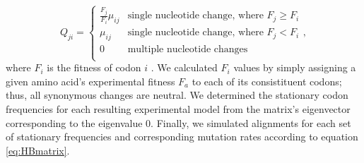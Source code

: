 \documentclass{pnastwo}
\begin{document}
\begin{article}
\begin{equation}
Q_{ji} = \left\{ 
\begin{array}{rl}
  \frac{F_j}{F_i}\mu_{ij} &\mbox{single nucleotide change, where $F_j \geq F_i$} \\
  \mu_{ij}           &\mbox{single nucleotide change, where $F_j < F_i$}  \\ 
  0                  &\mbox{multiple nucleotide changes} \\        
\end{array} \right.,
\end{equation}
where $F_i$ is the fitness of codon $i$ \cite{Bloom2014a,Bloom2014b}. We calculated $F_i$ values by simply assigning a given amino acid's experimental fitness $F_a$ to each of its consistituent codons; thus, all synonymous changes are neutral. We determined the stationary codon frequencies for each resulting experimental model from the matrix's eigenvector corresponding to the eigenvalue 0. Finally, we simulated alignments for each set of stationary frequencies and corresponding mutation rates according to equation \eqref{eq:HBmatrix}.   

		

\end{article}
\end{document}
